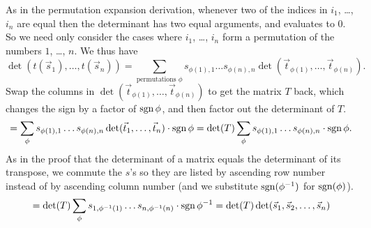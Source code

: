 \begin{exercises}
\begin{answer}
      As in the permutation expansion derivation,
      whenever two of the indices in $i_1$, \ldots, $i_n$ are equal 
      then the determinant
      has two equal arguments, and evaluates to $0$. 
      So we need only consider the cases where $i_1$, \ldots, $i_n$ form a
      permutation of the numbers $1$, \ldots, $n$.
      We thus have
      \begin{equation*}
        \det(t(\vec{s}_1),\dots,t(\vec{s}_n))=
          \sum_{\text{permutations\ } \phi}
            s_{\phi(1),1}\dots s_{\phi(n),n}
            \det(\vec{t}_{\phi(1)},\dots,\vec{t}_{\phi(n)}).
      \end{equation*}
      Swap the columns in $\det(\vec{t}_{\phi(1)},\ldots,\vec{t}_{\phi(n)})$
      to get the matrix \( T \) back, which changes the sign by a factor of 
      $\operatorname{sgn}{\phi}$,
      and then factor out the determinant of $T$.
      \begin{equation*}
        =\sum_\phi
          s_{\phi(1),1}\dots s_{\phi(n),n}
            \det(\vec{t}_1,\dots,\vec{t}_n)\cdot\operatorname{sgn}{\phi}
        =\det(T)\sum_\phi
          s_{\phi(1),1}\dots s_{\phi(n),n}\cdot\operatorname{sgn}{\phi}.
      \end{equation*}
      As in the proof that the determinant of a matrix 
      equals the determinant 
      of its transpose, we commute the $s$'s so they are listed by ascending
      row number instead of by ascending column number
      (and we substitute $\operatorname{sgn}(\phi^{-1})$ for $\operatorname{sgn}(\phi)$).
      \begin{equation*}
        =\det(T)\sum_\phi
          s_{1,\phi^{-1}(1)}\dots s_{n,\phi^{-1}(n)}\cdot\operatorname{sgn}{\phi^{-1}}  
        =\det(T)\det(\vec{s}_1,\vec{s}_2,\dots,\vec{s}_n)
      \end{equation*}
    \end{answer}

\end{exercises}
